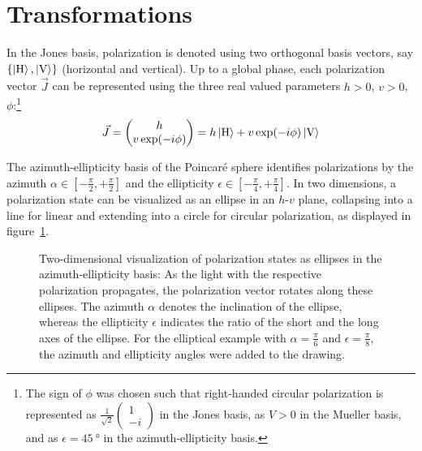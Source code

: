 \section*{Transformations}
In the Jones basis, polarization is denoted using two orthogonal basis vectors, say $\{\Ket{\text{H}}, \Ket{\text{V}}\}$ (horizontal and vertical). Up to a global phase, each polarization vector $\vec J$ can be represented using the three real valued parameters $h > 0$, $v > 0$, $\phi$:\footnote[1]{The sign of $\phi$ was chosen such that right-handed circular polarization is represented as $\frac{1}{\sqrt{2}}\begin{pmatrix}1 \\ -i \end{pmatrix}$ in the Jones basis, as $V > 0$ in the Mueller basis, and as $\epsilon  = \SI{45}{\degree}$ in the azimuth-ellipticity basis.}
\begin{align}
    \vec J = \begin{pmatrix}h \\ v \exp(-i \phi)\end{pmatrix} = h \Ket{\text{H}} + v \exp(-i\phi) \Ket{\text{V}}
\end{align}

The azimuth-ellipticity basis of the Poincaré sphere identifies polarizations by the azimuth $\alpha \in \left[-\frac{\pi}{2}, +\frac{\pi}{2}\right]$ and the ellipticity $\epsilon \in \left[-\frac{\pi}{4}, +\frac{\pi}{4}\right]$. In two dimensions, a polarization state can be visualized as an ellipse in an $h$-$v$ plane, collapsing into a line for linear and extending into a circle for circular polarization, as displayed in figure~\ref{fig:azimuth_ellipticity_visualization}.

\begin{figure}
    \centering
    \scalebox{1.0}{
    \begin{pgfpicture}
        \pgftext{}
    \end{pgfpicture}
    }
    \caption{Two-dimensional visualization of polarization states as ellipses in the azimuth-ellipticity basis: As the light with the respective polarization propagates, the polarization vector rotates along these ellipses. The azimuth $\alpha$ denotes the inclination of the ellipse, whereas the ellipticity $\epsilon$ indicates the ratio of the short and the long axes of the ellipse. For the elliptical example with $\alpha = \frac{\pi}{6}$ and $\epsilon = \frac{\pi}{8}$, the azimuth and ellipticity angles were added to the drawing.}
    \label{fig:azimuth_ellipticity_visualization}
\end{figure}

